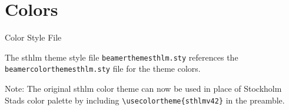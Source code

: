\documentclass[newPxFont]{beamer}
\begin{document}
%
%
\section{Colors}


\begin{frame}[containsverbatim,c]{Color Style File}

The sthlm theme style file \texttt{beamerthemesthlm.sty} references the \texttt{beamercolorthemesthlm.sty} file for the theme colors.

\vspace{1em}

\begin{block}{Note:}
The original sthlm color theme can now be used in place of Stockholm Stads color palette by including \newline \lstinline!\usecolortheme{sthlmv42}! in the preamble.
\end{block}

\end{frame}

\end{document}
